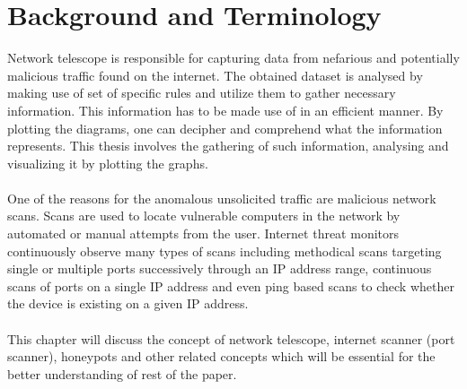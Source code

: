 \chapter{Background and Terminology}
Network telescope is responsible for capturing data from nefarious and potentially malicious traffic found on the internet.
The obtained dataset is analysed by making use of set of specific rules and utilize them to gather necessary information.
This information has to be made use of in an efficient manner.
By plotting the diagrams, one can decipher and comprehend what the information represents.
This thesis involves the gathering of such information, analysing and visualizing it by plotting the graphs.\\\\
One of the reasons for the anomalous unsolicited traffic are malicious network scans.
Scans are used to locate vulnerable computers in the network by automated or manual attempts from the user.
Internet threat monitors continuously observe many types of scans including methodical scans targeting single or multiple ports successively through an IP address range, continuous scans of ports on a single IP address and even ping based scans to check whether the device is existing on a given IP address.\\\\
This chapter will discuss the concept of network telescope, internet scanner (port scanner), honeypots and other related concepts which will be essential for the better understanding of rest of the paper.
